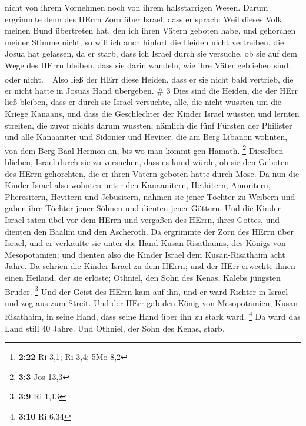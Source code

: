 nicht von ihrem Vornehmen noch von ihrem halsstarrigen Wesen.
 Darum ergrimmte denn des HErrn Zorn über Israel, dass er
sprach: Weil dieses Volk meinen Bund übertreten hat, den ich ihren
Vätern geboten habe, und gehorchen meiner Stimme nicht,  so
will ich auch hinfort die Heiden nicht vertreiben, die Josua hat
gelassen, da er starb,  dass ich Israel durch sie versuche,
ob sie auf dem Wege des HErrn bleiben, dass sie darin wandeln, wie ihre
Väter geblieben sind, oder nicht. \footnote{\textbf{2:22} Ri 3,1; Ri
  3,4; 5Mo 8,2}  Also ließ der HErr diese Heiden, dass er
sie nicht bald vertrieb, die er nicht hatte in Josuas Hand übergeben. \#
3  Dies sind die Heiden, die der HErr ließ bleiben, dass er
durch sie Israel versuchte, alle, die nicht wussten um die Kriege
Kanaans,  und dass die Geschlechter der Kinder Israel
wüssten und lernten streiten, die zuvor nichts darum wussten,
 nämlich die fünf Fürsten der Philister und alle Kanaaniter
und Sidonier und Heviter, die am Berg Libanon wohnten, von dem Berg
Baal-Hermon an, bis wo man kommt gen Hamath. \footnote{\textbf{3:3} Jos
  13,3}  Dieselben blieben, Israel durch sie zu versuchen,
dass es kund würde, ob sie den Geboten des HErrn gehorchten, die er
ihren Vätern geboten hatte durch Mose.  Da nun die Kinder
Israel also wohnten unter den Kanaanitern, Hethitern, Amoritern,
Pheresitern, Hevitern und Jebusitern,  nahmen sie jener
Töchter zu Weibern und gaben ihre Töchter jener Söhnen und dienten jener
Göttern.  Und die Kinder Israel taten übel vor dem HErrn und
vergaßen des HErrn, ihres Gottes, und dienten den Baalim und den
Ascheroth.  Da ergrimmte der Zorn des HErrn über Israel, und
er verkaufte sie unter die Hand Kusan-Risathaims, des Königs von
Mesopotamien; und dienten also die Kinder Israel dem Kusan-Risathaim
acht Jahre.  Da schrien die Kinder Israel zu dem HErrn; und
der HErr erweckte ihnen einen Heiland, der sie erlöste; Othniel, den
Sohn des Kenas, Kalebs jüngsten Bruder. \footnote{\textbf{3:9} Ri 1,13}
 Und der Geist des HErrn kam auf ihn, und er ward Richter
in Israel und zog aus zum Streit. Und der HErr gab den König von
Mesopotamien, Kusan-Risathaim, in seine Hand, dass seine Hand über ihn
zu stark ward. \footnote{\textbf{3:10} Ri 6,34}  Da ward
das Land still 40 Jahre. Und Othniel, der Sohn des Kenas, starb.

